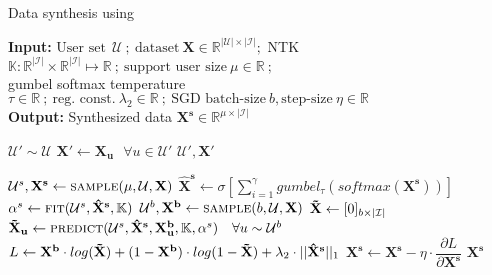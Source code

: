 \documentclass{article}
\begin{document}
\begin{algorithm}[H]
\centering
\caption{Data synthesis using \sampler} \label{alg:distill}
    \begin{flushleft}
        \textbf{Input:} $\text{User set}~~ \mathcal{U} ~;~ \text{dataset}~ \mathbf{X} \in \mathbb{R}^{|\mathcal{U}| \times |\mathcal{I}|} ;$ NTK $\mathbb{K} : \mathbb{R}^{|\mathcal{I}|} \times \mathbb{R}^{|\mathcal{I}|} \mapsto \mathbb{R} ~;~ \text{support user size}~ \mu \in \mathbb{R} ~;~ $ \\
        gumbel softmax temperature $\tau \in \mathbb{R} ~;~ \text{reg. const.}~ \lambda_2 \in \mathbb{R} ~;~ \text{SGD batch-size}~ b, \text{step-size}~ \eta \in \mathbb{R}$ \\
        \textbf{Output:} Synthesized data $\mathbf{X^s} \in \mathbb{R}^{\mu \times |\mathcal{I}|}$
    \end{flushleft}
    \begin{algorithmic}[1]
            \State $\mathcal{U}' \sim \mathcal{U}$ 
            \State $\mathbf{X'} \leftarrow \mathbf{X_u} ~~~ \forall u \in \mathcal{U}'$ 
            \State \Return $\mathcal{U}', \mathbf{X'}$
        \EndProcedure
    
            \State $\mathcal{U}^s, \mathbf{X^s} \leftarrow \textsc{sample}(\mu, \mathcal{U}, \mathbf{X})$ 
                \State $\mathbf{\hat{X}^s} \leftarrow \sigma \left[ \sum_{i=1}^{\gamma} gumbel_{\tau}(softmax(\mathbf{X^s})) \right]$
                \State $\alpha^s \leftarrow \textsc{fit}(\mathcal{U}^s, \mathbf{\hat{X}^s}, \mathbb{K})$ 
                \State $\mathcal{U}^b, \mathbf{X^b} \leftarrow \textsc{sample}(b, \mathcal{U}, \mathbf{X})$
                \State $\mathbf{\Tilde{X}} \leftarrow [0]_{b \times |\mathcal{I}|}$
                \State $\mathbf{\Tilde{X}_u} \leftarrow \textsc{predict}(\mathcal{U}^s, \mathbf{\hat{X}^s}, \mathbf{X^b_u}, \mathbb{K}, \alpha^s) ~~~ \forall u \sim \mathcal{U}^b$ 
                \State $L \leftarrow \mathbf{X^b} \cdot log(\mathbf{\Tilde{X}}) + (1 - \mathbf{X^b}) \cdot log(1 - \mathbf{\Tilde{X}}) + \lambda_2 \cdot ||\mathbf{\hat{X}^s}||_1$ 
                \State $\mathbf{X^s} \leftarrow \mathbf{X^s} - \eta \cdot \dfrac{\partial L}{\partial \mathbf{X^s}}$ 
            \EndFor
            \State \Return $\mathbf{X^s}$
        \EndProcedure
    \end{algorithmic}
\end{algorithm} 
\end{document}
